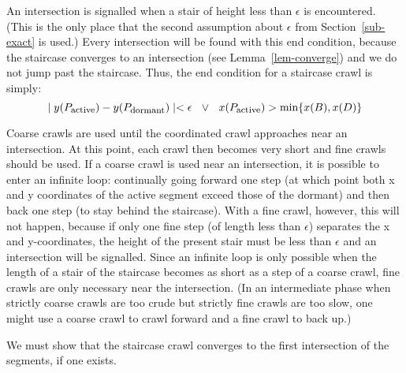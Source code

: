 
An intersection is signalled when a stair of height less than $\epsilon$ is 
encountered.
(This is the only place that the second assumption about $\epsilon$ from Section~\ref{sub-exact}
is used.)
Every intersection will be found with this end condition, because the staircase converges
to an intersection (see Lemma~\ref{lem-converge}) and we do not jump past the staircase.
Thus, the end condition for a staircase crawl is simply:
\[ \mid y(P_{\mbox{\footnotesize{active}}}) - y(P_{\mbox{\footnotesize{dormant}}}) \mid 
	< \epsilon   \ \ \vee \ \ 
   x(P_{\mbox{\footnotesize{active}}}) > \mbox{min} \{x(B),x(D)\}
\]

Coarse crawls are used until the coordinated crawl approaches near an intersection.
At this point, each crawl then becomes very short and fine crawls should be used.
If a coarse crawl is used near an intersection, it is possible to enter an infinite loop:
continually going forward one step (at which point both x and y coordinates of the active segment
exceed those of the dormant) and then back one step (to stay behind the staircase).  
With a fine crawl, however, this will not happen, because if only one fine step (of length 
less than 
$\epsilon$) separates the x and y-coordinates, the height of the present stair must be less 
than $\epsilon$ and an intersection will be signalled.
Since an infinite loop is only possible when the length of a stair of the staircase becomes 
as short as a step of a coarse crawl, fine crawls are only necessary near the 
intersection.
(In an intermediate phase when strictly coarse crawls are too crude 
but strictly fine crawls are too slow, one might use a coarse crawl to crawl forward 
and a fine crawl to back up.)

We must show that the staircase crawl converges to the first intersection of the segments,
if one exists.

